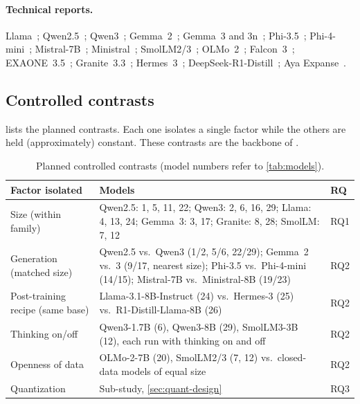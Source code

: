 \paragraph{Technical reports.} Llama~\citep{grattafiori2024llama3};
Qwen2.5~\citep{qwen2025qwen25}; Qwen3~\citep{yang2025qwen3};
Gemma~2~\citep{gemmateam2024gemma2}; Gemma~3 and 3n~\citep{gemmateam2025gemma3,google2025gemma3n};
Phi-3.5~\citep{abdin2024phi3}; Phi-4-mini~\citep{microsoft2025phi4mini};
Mistral-7B~\citep{jiang2023mistral}; Ministral~\citep{mistral2024ministral};
SmolLM2/3~\citep{allal2025smollm2,hf2025smollm3}; OLMo~2~\citep{olmo2024olmo2};
Falcon~3~\citep{tii2024falcon3}; EXAONE~3.5~\citep{lgai2024exaone35};
Granite~3.3~\citep{ibm2025granite33}; Hermes~3~\citep{teknium2024hermes3};
DeepSeek-R1-Distill~\citep{deepseekai2025r1}; Aya Expanse~\citep{dang2024ayaexpanse}.

\subsection{Controlled contrasts}
 lists the planned contrasts. Each one isolates a single factor
while the others are held (approximately) constant. These contrasts are the backbone
of .

\begin{table}[ht]
\centering
\caption{Planned controlled contrasts (model numbers refer to \cref{tab:models}).}
\label{tab:contrasts}
\small
\begin{tabularx}{\textwidth}{@{}l>{\raggedright\arraybackslash}X l@{}}
\toprule
Factor isolated & Models & RQ \\
\midrule
Size (within family) & Qwen2.5: 1, 5, 11, 22; Qwen3: 2, 6, 16, 29; Llama: 4, 13, 24; Gemma~3: 3, 17; Granite: 8, 28; SmolLM: 7, 12 & RQ1 \\
Generation (matched size) & Qwen2.5 vs.\ Qwen3 (1/2, 5/6, 22/29); Gemma~2 vs.\ 3 (9/17, nearest size); Phi-3.5 vs.\ Phi-4-mini (14/15); Mistral-7B vs.\ Ministral-8B (19/23) & RQ2 \\
Post-training recipe (same base) & Llama-3.1-8B-Instruct (24) vs.\ Hermes-3 (25) vs.\ R1-Distill-Llama-8B (26) & RQ2 \\
Thinking on/off & Qwen3-1.7B (6), Qwen3-8B (29), SmolLM3-3B (12), each run with thinking on and off & RQ2 \\
Openness of data & OLMo-2-7B (20), SmolLM2/3 (7, 12) vs.\ closed-data models of equal size & RQ2 \\
Quantization & Sub-study, \cref{sec:quant-design} & RQ3 \\
\bottomrule
\end{tabularx}
\end{table}

